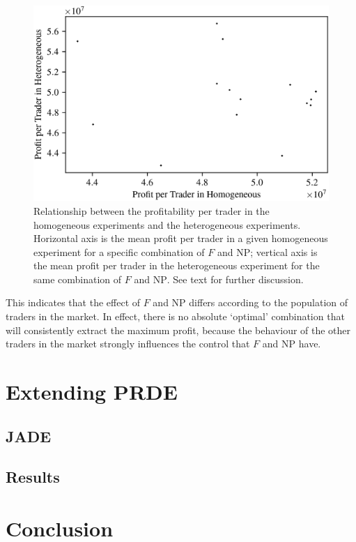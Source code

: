 \documentclass[conference]{IEEEtran}
\begin{document}
\begin{figure}[htbp]
    \centerline{\includegraphics[width=\columnwidth]{heterogeneous_homogeneous_scatter.png}}
    \caption{
        Relationship between the profitability per trader in the homogeneous experiments and the heterogeneous experiments.
        Horizontal axis is the mean profit per trader in a given homogeneous experiment for a specific combination of $F$ and $\mathrm{NP}$; vertical axis is the mean profit per trader in the heterogeneous experiment for the same combination of $F$ and $\mathrm{NP}$.
        See text for further discussion.
    }
    \label{heterogeneous_homogeneous}
\end{figure}

This indicates that the effect of $F$ and $\mathrm{NP}$ differs according to the population of traders in the market.
In effect, there is no absolute `optimal' combination that will consistently extract the maximum profit, because the behaviour of the other traders in the market strongly influences the control that $F$ and $\mathrm{NP}$ have.

\section{Extending PRDE}

\subsection{JADE}

\subsection{Results}

\section{Conclusion}



\end{document}
